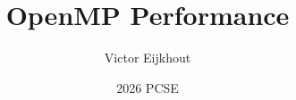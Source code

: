 \documentclass[10pt]{beamer}
\begin{document}
\author[Eijkhout]{Victor Eijkhout}
\date[2026]{2026 PCSE}
\title[performance]{OpenMP Performance}
\maketitle


\end{document}
